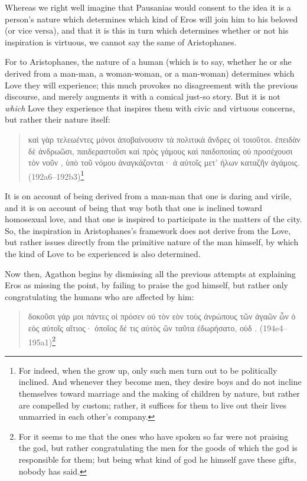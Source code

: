 Whereas we right well imagine that Pausanias would consent to the idea
it is a person's nature which determines which kind of Eros will join
him to his beloved (or vice versa), and that it is this in turn which
determines whether or not his inspiration is virtuous, we cannot say the
same of Aristophanes.

For to Aristophanes, the nature of a human (which is to say, whether he
or she derived from a man-man, a woman-woman, or a man-woman) determines
which Love they will experience; this much provokes no disagreement with
the previous discourse, and merely augments it with a comical just-so
story. But it is not \emph{which} Love they experience that inspires
them with civic and virtuous concerns, but rather their nature itself:

\begin{quote}
\textgreek{καὶ γὰρ τελεωέντες μόνοι ἀποβαίνουσιν  τὰ
πολιτικὰ ἄνδρες οἱ τοιοῦτοι. ἐπειδὰν δὲ ἀνδρωῶσι,
παιδεραστοῦσι καὶ πρὸς γάμους καὶ παιδοποιίας οὐ προσέχουσι τὸν νοῦν
,  ὑπὸ τοῦ νόμου ἀναγκάζονται· ἀ
 αὐτοῖς μετ' ήλων καταζῆν ἀγάμοις.}
(192a6--192b3)\footnote{For indeed, when the grow up, only such men
turn out to be politically inclined. And whenever they become men,
they desire boys and do not incline themselves toward marriage and
the making of children by nature, but rather are compelled by custom;
rather, it suffices for them to live out their lives unmarried in
each other's company.}
\end{quote}

It is on account of being derived from a man-man that one is daring and
virile, and it is on account of being that way both that one is inclined
toward homosexual love, and that one is inspired to participate in the
matters of the city. So, the inspiration in Aristophanes's framework
does not derive from the Love, but rather issues directly from the
primitive nature of the man himself, by which the kind of Love to be
experienced is also determined.

Now then, Agathon begins by dismissing all the previous attempts at
explaining Eros as missing the point, by failing to praise the god
himself, but rather only congratulating the humans who are affected by
him:

\begin{quote}
\textgreek{δοκοῦσι γάρ μοι πάντες οἱ πρόσεν 
οὐ τὸν εὸν   τοὺς
ἀνρώπους  τῶν ἀγαῶν ὧν ὁ
εὸς αὐτοῖς αἴτιος· ὁποῖος δέ τις αὐτὸς ὢν ταῦτα ἐδωρήσατο,
οὐδ .} (194e4--195a1)\footnote{For it seems to
me that the ones who have spoken so far were not praising the god, but
rather congratulating the men for the goods of which the god is
responsible for them; but being what kind of god he himself gave these
gifts, nobody has said.}
\end{quote}


